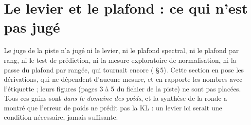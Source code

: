 \section{Le levier et le plafond : ce qui n'est pas jugé}\label{t3spe:sec:levier}

Le juge de la piste n'a jugé ni le levier, ni le plafond spectral, ni le plafond par rang, ni le test de prédiction, ni la mesure exploratoire de normalisation, ni la passe du plafond par rangée, qui tournait encore ( §\,5). Cette section en pose les dérivations, qui ne dépendent d'aucune mesure, et en rapporte les nombres avec l'étiquette  ; leurs figures (pages 3 à 5 du fichier de la piste) ne sont pas placées. Tous ces gains sont \emph{dans le domaine des poids}, et la synthèse de la ronde a montré que l'erreur de poids ne prédit pas la KL : un levier ici serait une condition nécessaire, jamais suffisante.

